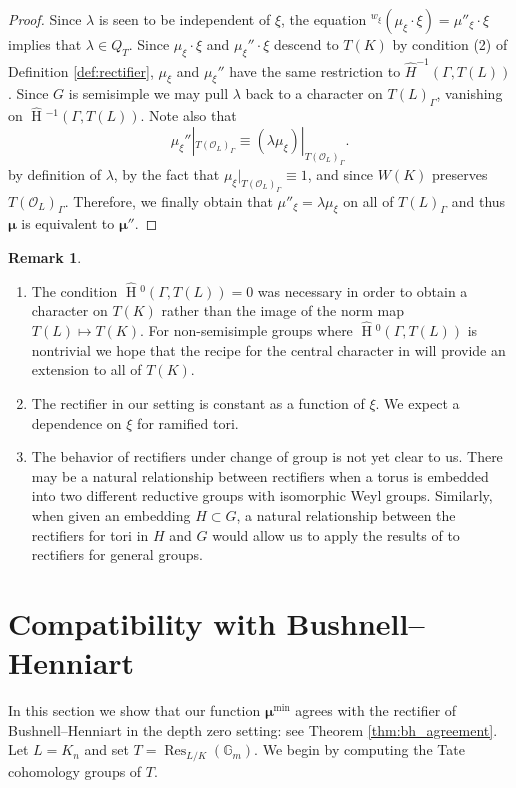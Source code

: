 \documentclass{mrlart7}
\theoremstyle{plain}
\newcommand{\HT}[1]{\hat{\HH}{}^{#1}}
\theoremstyle{definition}
\newtheorem{remark}[theorem]{Remark}
\numberwithin{equation}{section}
\DeclareMathOperator{\HH}{H}
\DeclareMathOperator{\Res}{Res}
\newcommand{\OL}{\mathcal{O}_L}
\newcommand{\Gm}{\mathbb{G}_m}
\newcommand{\bmu}{\boldsymbol\mu}
\newcommand{\mumin}{\bmu^{\min}}
\begin{document}
\begin{proof}
Since $\lambda$ is seen to be independent of $\xi$, the equation ${}^{w_\xi} (\mu_\xi \cdot \xi) = \mu''_\xi \cdot \xi$
implies that $\lambda \in Q_T$.  Since $\mu_\xi \cdot \xi$ and $\mu_\xi'' \cdot \xi$ descend to
$T(K)$ by condition (2) of Definition \ref{def:rectifier}, $\mu_\xi$ and $\mu_\xi''$ have the
same restriction to $\hat{H}^{-1}(\Gamma, T(L))$.  Since $G$ is semisimple we may pull $\lambda$ back to
a character on $T(L)_\Gamma$, vanishing on $\HT{-1}(\Gamma, T(L))$.  Note also that
\[
\mu_{\xi}''|_{T(\OL)_{\Gamma}} \equiv (\lambda \mu_{\xi})|_{T(\OL)_{\Gamma}}.
\]
by definition of $\lambda$, by the fact that $\mu_\xi|_{T(\OL)_{\Gamma}} \equiv 1$,
and since $W(K)$ preserves $T(\OL)_{\Gamma}$.  Therefore, we finally obtain that
$\mu''_\xi = \lambda\mu_\xi$ on all of $T(L)_{\Gamma}$ and thus $\bmu$ is equivalent to $\bmu''$.
\end{proof}

\begin{remark} $ $
\begin{enumerate}
\item The condition $\HT{0}(\Gamma, T(L)) = 0$ was necessary in order to obtain a character on $T(K)$ rather
than the image of the norm map $T(L) \mapsto T(K)$.  For non-semisimple groups where $\HT{0}(\Gamma, T(L))$
is nontrivial we hope that the recipe for the central character in \cite{gross-reeder:09a} will provide an extension to all of $T(K)$.
\item The rectifier in our setting is constant as a function of $\xi$.  We expect a dependence on $\xi$ for ramified tori.
\item The behavior of rectifiers under change of group is not yet clear to us.  There may be a natural relationship between
rectifiers when a torus is embedded into two
different reductive groups with isomorphic Weyl groups.  Similarly, when given an embedding
$H \subset G$, a natural relationship between the rectifiers for tori in $H$ and $G$ would allow us to apply the
results of \cite{bushnell-henniart:10a} to rectifiers for general groups.
\end{enumerate}
\end{remark}

\section{Compatibility with Bushnell--Henniart} \label{section:BH_compat}

In this section we show that our function $\mumin$
agrees with the rectifier of Bushnell--Henniart in the depth
zero setting: see Theorem \ref{thm:bh_agreement}.
Let $L = K_n$ and set
$T = \Res_{L/K}(\Gm)$.  We begin by computing the Tate cohomology groups of $T$.
\end{document}
